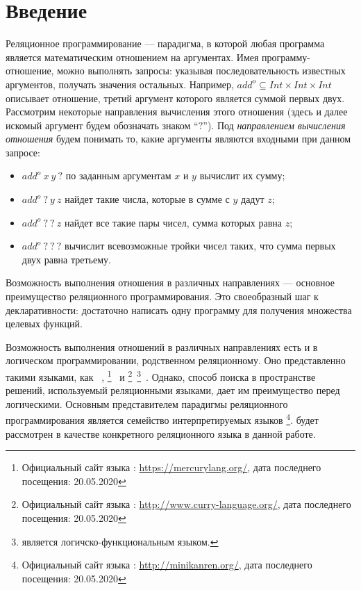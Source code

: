 \section*{Введение}

Реляционное программирование --- парадигма, в которой любая программа является математическим отношением на аргументах. 
Имея программу-отношение, можно выполнять запросы: указывая последовательность известных аргументов, получать значения остальных.
Например, $add^o \subseteq Int \times Int \times Int$ описывает отношение, третий аргумент которого является суммой первых двух. 
Рассмотрим некоторые направления вычисления этого отношения (здесь и далее искомый аргумент будем обозначать знаком ``$?$'').
Под \emph{направлением вычисления отношения} будем понимать то, какие аргументы являются входными при данном запросе:
\begin{itemize}
    \item $add^o \ x \ y \ ?$ по заданным аргументам $x$ и $y$ вычислит их сумму;
    \item $add^o \ ? \ y \ z$ найдет такие числа, которые в сумме с $y$ дадут $z$;
    \item $add^o \ ? \ ? \ z$ найдет все такие пары чисел, сумма которых равна $z$;
    \item $add^o \ ? \ ? \ ?$ вычислит всевозможные тройки чисел таких, что сумма первых двух равна третьему.
\end{itemize}

Возможность выполнения отношения в различных направлениях --- основное преимущество реляционного программирования. 
Это своеобразный шаг к декларативности: достаточно написать одну программу для получения множества целевых функций. 

Возможность выполнения отношений в различных направлениях есть и в логическом программировании, родственном реляционному.
Оно представленно такими языками, как \prolog{}~\cite{Malpas1987prolog}, \mercury{}\footnote{Официальный сайт языка \mercury{}: \url{https://mercurylang.org/}, дата последнего посещения: 20.05.2020}~\cite{SOMOGYI199617} и \curry{}\footnote{Официальный сайт языка \curry{}: \url{http://www.curry-language.org/}, дата последнего посещения: 20.05.2020}~\footnote{\curry{} является логичско-функциональным языком.}~\cite{Hanus2016CIF}.
Однако, способ поиска в пространстве решений, используемый реляционными языками, дает им преимущество перед логическими.
Основным представителем парадигмы реляционного программирования является семейство интерпретируемых языков \miniKanren{}\footnote{Официальный сайт языка \miniKanren{}: \url{http://minikanren.org/}, дата последнего посещения: 20.05.2020}.
\miniKanren{} будет рассмотрен в качестве конкретного реляционного языка в данной работе.

